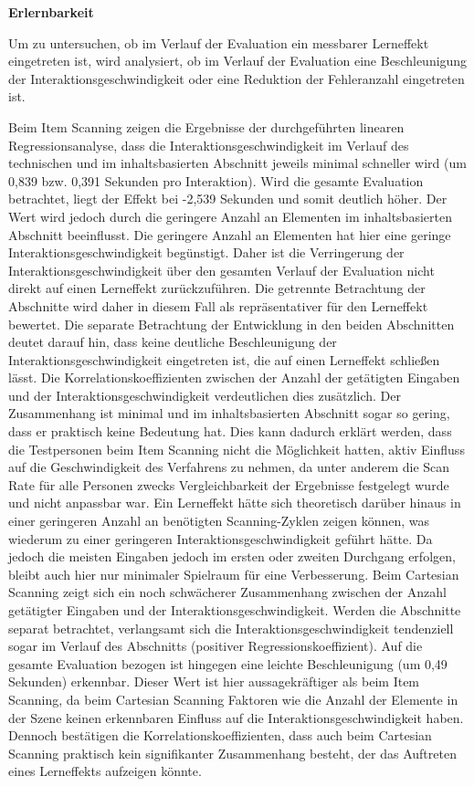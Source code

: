 \textbf{Erlernbarkeit}

Um zu untersuchen, ob im Verlauf der Evaluation ein messbarer Lerneffekt eingetreten ist, wird analysiert, ob im Verlauf der Evaluation eine Beschleunigung der Interaktionsgeschwindigkeit oder eine Reduktion der Fehleranzahl eingetreten ist.

Beim Item Scanning zeigen die Ergebnisse der durchgeführten linearen Regressionsanalyse, dass die Interaktionsgeschwindigkeit im Verlauf des technischen und im inhaltsbasierten Abschnitt jeweils minimal schneller wird (um 0,839 bzw. 0,391 Sekunden pro Interaktion). Wird die gesamte Evaluation betrachtet, liegt der Effekt bei -2,539 Sekunden und somit deutlich höher. Der Wert wird jedoch durch die geringere Anzahl an Elementen im inhaltsbasierten Abschnitt beeinflusst. Die geringere Anzahl an Elementen hat hier eine geringe Interaktionsgeschwindigkeit begünstigt. Daher ist die Verringerung der Interaktionsgeschwindigkeit über den gesamten Verlauf der Evaluation nicht direkt auf einen Lerneffekt zurückzuführen. Die getrennte Betrachtung der Abschnitte wird daher in diesem Fall als repräsentativer für den Lerneffekt bewertet. Die separate Betrachtung der Entwicklung in den beiden Abschnitten deutet darauf hin, dass keine deutliche Beschleunigung der Interaktionsgeschwindigkeit eingetreten ist, die auf einen Lerneffekt schließen lässt. Die Korrelationskoeffizienten zwischen der Anzahl der getätigten Eingaben und der Interaktionsgeschwindigkeit verdeutlichen dies zusätzlich. Der Zusammenhang ist minimal und im inhaltsbasierten Abschnitt sogar so gering, dass er praktisch keine Bedeutung hat. Dies kann dadurch erklärt werden, dass die Testpersonen beim Item Scanning nicht die Möglichkeit hatten, aktiv Einfluss auf die Geschwindigkeit des Verfahrens zu nehmen, da unter anderem die Scan Rate für alle Personen zwecks Vergleichbarkeit der Ergebnisse festgelegt wurde und nicht anpassbar war. Ein Lerneffekt hätte sich theoretisch darüber hinaus in einer geringeren Anzahl an benötigten Scanning-Zyklen zeigen können, was wiederum zu einer geringeren Interaktionsgeschwindigkeit geführt hätte. Da jedoch die meisten Eingaben jedoch im ersten oder zweiten Durchgang erfolgen, bleibt auch hier nur minimaler Spielraum für eine Verbesserung.
Beim Cartesian Scanning zeigt sich ein noch schwächerer Zusammenhang zwischen der Anzahl getätigter Eingaben und der Interaktionsgeschwindigkeit. Werden die Abschnitte separat betrachtet, verlangsamt sich die Interaktionsgeschwindigkeit tendenziell sogar im Verlauf des Abschnitts (positiver Regressionskoeffizient). Auf die gesamte Evaluation bezogen ist hingegen eine leichte Beschleunigung (um 0,49 Sekunden) erkennbar. Dieser Wert ist hier aussagekräftiger als beim Item Scanning, da beim Cartesian Scanning Faktoren wie die Anzahl der Elemente in der Szene keinen erkennbaren Einfluss auf die Interaktionsgeschwindigkeit haben. Dennoch bestätigen die Korrelationskoeffizienten, dass auch beim Cartesian Scanning praktisch kein signifikanter Zusammenhang besteht, der das Auftreten eines Lerneffekts aufzeigen könnte.

